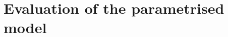 \documentclass[../main.tex]{subfiles}
\begin{document}
\ifSubfilesClassLoaded{
    \frontmatter
    \tableofcontents
    \mainmatter
}{}

\chapter{Evaluation of the parametrised model} \label{chap:evaluation}


\ifSubfilesClassLoaded{%
    \emergencystretch=5em
    \printbibliography{}
}{}
\end{document}

